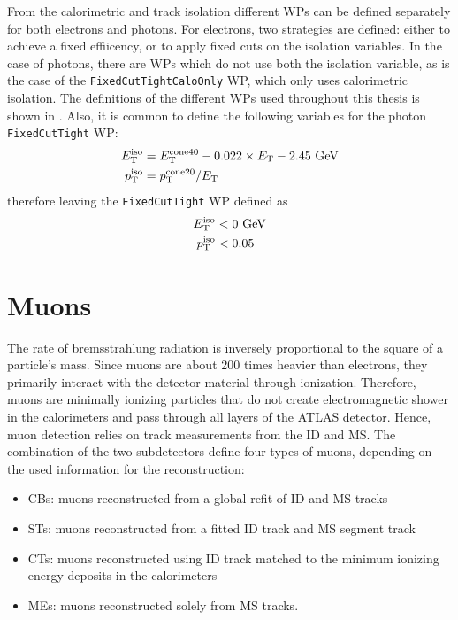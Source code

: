 From the calorimetric and track isolation different \acp{WP} can be defined separately for both electrons and photons. For electrons, two strategies are defined: either to achieve a fixed effiicency, or to apply fixed cuts on the isolation variables. In the case of photons, there are \acp{WP} which do not use both the isolation variable, as is the case of the \texttt{FixedCutTightCaloOnly} \ac{WP}, which only uses calorimetric isolation. The definitions of the different \acp{WP} used throughout this thesis is shown in \Tab{\ref{fig:objects:egamma:iso:iso_table}}. Also, it is common to define the following variables for the photon \texttt{FixedCutTight} \ac{WP}:
\begin{align}
    E_{\text{T}}^{\text{iso}} &= E_{\text{T}}^{\text{cone40}} - 0.022 \times E_{\text{T}} - 2.45~\text{GeV}\\
    p_{\text{T}}^{\text{iso}} &= p_{\text{T}}^{\text{cone20}} / E_{\text{T}}
\end{align}
therefore leaving the \texttt{FixedCutTight} \ac{WP} defined as
\begin{align}
    E_{\text{T}}^{\text{iso}} &< 0 ~\text{GeV}\\
    p_{\text{T}}^{\text{iso}} &< 0.05 
\end{align}















\section{Muons}



The rate of bremsstrahlung radiation is inversely proportional to the square of a particle's mass. Since muons are about 200 times heavier than electrons, they primarily interact with the detector material through ionization. Therefore, muons are minimally ionizing particles that do not create electromagnetic shower in the calorimeters and pass through all layers of the \ac{ATLAS} detector. Hence, muon detection relies on track measurements from the \ac{ID} and \ac{MS}. The combination of the two subdetectors define four types of muons, depending on the used information for the reconstruction:
\begin{itemize}
    \item \acp{CB}: muons reconstructed from a global refit of \ac{ID} and \ac{MS} tracks
    \item \acp{ST}: muons reconstructed from a fitted \ac{ID} track and \ac{MS} segment track
    \item \acp{CT}: muons reconstructed using \ac{ID} track matched to the minimum ionizing energy deposits in the calorimeters
    \item \acp{ME}: muons reconstructed solely from \ac{MS} tracks.
\end{itemize}



